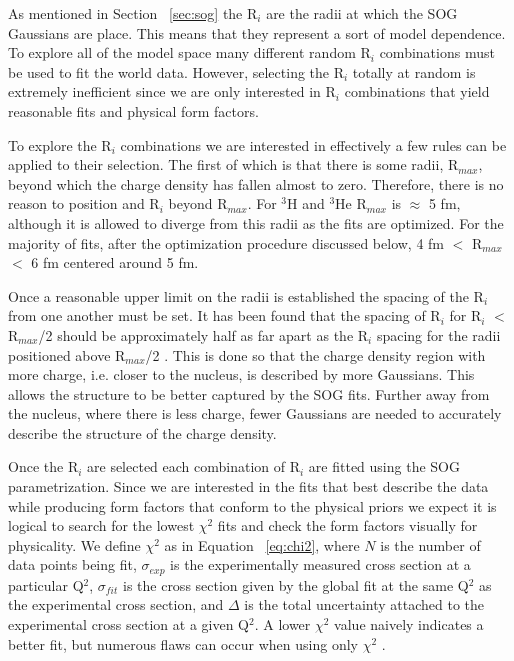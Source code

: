 As mentioned in Section ~\ref{sec:sog} the R$_i$ are the radii at which the SOG Gaussians are place. This means that they represent a sort of model dependence. To explore all of the model space many different random R$_i$ combinations must be used to fit the world data. However, selecting the R$_i$ totally at random is extremely inefficient since we are only interested in R$_i$ combinations that yield reasonable fits and physical form factors. 

To explore the R$_i$ combinations we are interested in effectively a few rules can be applied to their selection. The first of which is that there is some radii, R$_{max}$, beyond which the charge density has fallen almost to zero. Therefore, there is no reason to position and R$_i$ beyond R$_{max}$. For $^3$H and $^3$He R$_{max}$ is $\approx$ 5 fm, although it is allowed to diverge from this radii as the fits are optimized. For the majority of fits, after the optimization procedure discussed below, 4 fm $<$ R$_{max}$ $<$ 6 fm centered around 5 fm.

Once a reasonable upper limit on the radii is established the spacing of the R$_i$ from one another must be set. It has been found that the spacing of R$_i$ for R$_i$ $<$ R$_{max}$/2 should be approximately half as far apart as the R$_i$ spacing for the radii positioned above R$_{max}$/2 \cite{Article:SOG}. This is done so that the charge density region with more charge, i.e. closer to the nucleus, is described by more Gaussians. This allows the structure to be better captured by the SOG fits. Further away from the nucleus, where there is less charge, fewer Gaussians are needed to accurately describe the structure of the charge density.   

Once the R$_i$ are selected each combination of R$_i$ are fitted using the SOG parametrization. Since we are interested in the fits that best describe the data while producing form factors that conform to the physical priors we expect it is logical to search for the lowest $\chi^2$ fits and check the form factors visually for physicality. We define $\chi^2$ as in Equation ~\ref{eq:chi2}, where $N$ is the number of data points being fit, $\sigma_{exp}$ is the experimentally measured cross section at a particular Q$^2$, $\sigma_{fit}$ is the cross section given by the global fit at the same Q$^2$ as the experimental cross section, and $\Delta$ is the total uncertainty attached to the experimental cross section at a given Q$^2$. A lower $\chi^2$ value naively indicates a better fit, but numerous flaws can occur when using only $\chi^2$ \cite{doug_stats}.  

